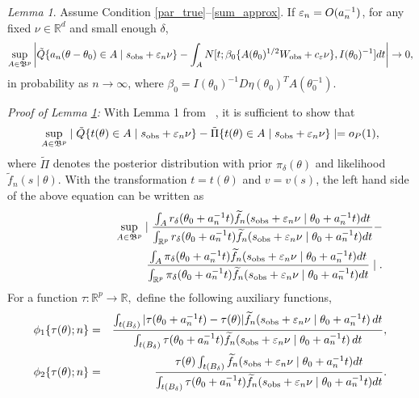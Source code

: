 \documentclass[9pt]{article}
\theoremstyle{remark}
\newtheorem{lemma}{Lemma}
\begin{document}
\begin{lemma}\label{Alemma1} Assume Condition \ref{par_true}--\ref{sum_approx}. If $\varepsilon_{n}=O(a_{n}^{-1})$, for any fixed $\nu\in\mathbb{R}^{d}$
	and small enough $\delta$, 
	\[
	\sup_{A\in\mathfrak{B}^{p}}\left|\tilde{Q}\{a_{n}(\theta-\theta_{0})\in A\mid s_{\rm obs}+\varepsilon_{n}\nu\}-\int_{A}N[t;\beta_{0}\{A(\theta_{0})^{1/2}W_{\rm obs}+c_{\varepsilon}\nu\},I(\theta_{0})^{-1}]dt\right|\rightarrow0,
	\]
	in probability as $n\rightarrow\infty$, where $\beta_{0}=I(\theta_{0})^{-1}D\eta(\theta_{0})^{T}A(\theta_{0}^{-1})$.
\end{lemma}
{\it Proof of Lemma \ref{Alemma1}:} 
	With Lemma 1 from ~\cite{Li2017}, it is sufficient to show that 
	\[
	\sup_{A\in\mathfrak{B}^{p}}\mid\tilde{Q}\{t(\theta)\in A\mid s_{\rm obs}+\varepsilon_{n}\nu\}-\tilde{\Pi}\{t(\theta)\in A\mid s_{\rm obs}+\varepsilon_{n}\nu\}\mid=o_{P}(1),
	\]
	where $\tilde{\Pi}$ denotes the posterior distribution with prior $\pi_{\delta}(\theta)$ and likelihood $\tilde{f}_n(s \mid \theta)$. 
With the transformation $t=t(\theta)$
	and $v=v(s)$, the left hand side of the above equation can be written
	as 
	\begin{eqnarray}
	&&\sup_{A\in\mathfrak{B}^{p}}\mid\frac{\int_{A}r_{\delta}(\theta_0+a_{n}^{-1}t)\ftil_{n}(s_{{\rm obs}}+\veps_{n}\nu\mid\theta_0+a_{n}^{-1}t)dt}{\int_{\mathbb{R}^{p}}r_{\delta}(\theta_0+a_{n}^{-1}t)\ftil_{n}(s_{{\rm obs}}+\veps_{n}\nu\mid\theta_0+a_{n}^{-1}t)dt}-\hfill \\ \notag
	&&\hspace{3cm}\frac{\int_{A}\pi_{\delta}(\theta_0+a_{n}^{-1}t)\ftil_{n}(s_{{\rm obs}}+\veps_{n}\nu\mid\theta_0+a_{n}^{-1}t)dt}{\int_{\mathbb{R}^{p}}\pi_{\delta}(\theta_0+a_{n}^{-1}t)\ftil_{n}(s_{{\rm obs}}+\veps_{n}\nu\mid\theta_0+a_{n}^{-1}t)dt}\mid.\label{eq1}
	\end{eqnarray}
	For a function $\tau:\mathbb{R}^{p}\rightarrow\mathbb{R},$ define
	the following auxiliary functions,
	\begin{eqnarray*}
		\phi_{1}\{\tau(\theta);n\} & = & \frac{\int_{t(B_{\delta})}|\tau(\theta_0+a_{n}^{-1}t)-\tau(\theta)|\widetilde{f}_{n}(s_{{\rm obs}}+\varepsilon_{n}\nu\mid\theta_0+a_{n}^{-1}t)\,dt}{\int_{t(B_{\delta})}\tau(\theta_0+a_{n}^{-1}t)\widetilde{f}_{n}(s_{{\rm obs}}+\varepsilon_{n}\nu\mid\theta_0+a_{n}^{-1}t)\,dt},\\
		\phi_{2}\{\tau(\theta);n\} & = & \frac{\tau(\theta)\int_{t(B_{\delta})}\widetilde{f}_{n}(s_{{\rm obs}}+\varepsilon_{n}\nu\mid\theta_0+a_{n}^{-1}t)dt}{\int_{t(B_{\delta})}\tau(\theta_0+a_{n}^{-1}t)\widetilde{f}_{n}(s_{{\rm obs}}+\varepsilon_{n}\nu\mid\theta_{0}+a_{n}^{-1}t)dt}.
	\end{eqnarray*}
\end{document}
